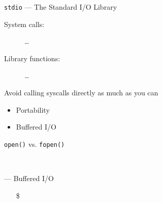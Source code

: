 \begin{frame}{}
  \centering
\end{frame}

\begin{frame}{\texttt{stdio} --- The Standard I/O Library}
  \begin{description}
  \item[System calls:] \ldots
  \item[Library functions:] \ldots
  \end{description}
  \begin{block}{Avoid calling syscalls directly as much as you can}
    \begin{minipage}{.4\linewidth}
      \begin{itemize}
      \item Portability
      \item Buffered I/O
      \end{itemize}
    \end{minipage}\qquad
    \begin{minipage}{.4\linewidth}
      \begin{center}
      \end{center}
    \end{minipage}
  \end{block}  
\end{frame}

\begin{frame}{\texttt{open()} {\scriptsize vs.} \texttt{fopen()}}
  \begin{center}
    \begin{minipage}{.48\linewidth}
      \\[1ex]
    \end{minipage}\quad
    \begin{minipage}{.48\linewidth}
       --- Buffered I/O\\[1ex]
    \end{minipage}
  \end{center}{\footnotesize
  \begin{itemize}
  \item[\$] 
  \end{itemize}}
\end{frame}

